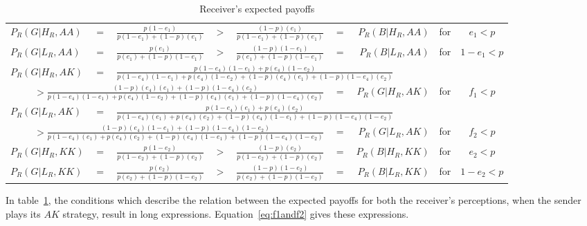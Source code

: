 \documentclass[a4paper,12pt]{article}
\numberwithin{equation}{section}
\begin{document}
\begin{table}[h]
\begin{center}
\setlength{\tabcolsep}{.22em}
\begin{tabular}{lcccccrcc}
$P_{R}(G|H_{R},AA)$ & $=$ & $\frac{p(1-e_{1})}{p(1-e_{1})+(1-p)(e_{1})}$ & $>$ & $\frac{(1-p)(e_{1})}{p(1-e_{1})+(1-p)(e_{1})}$ & $=$ & $P_{R}(B|H_{R},AA)$ & for & $e_{1}<p$\\
$P_{R}(G|L_{R},AA)$ & $=$ & $\frac{p(e_{1})}{p(e_{1})+(1-p)(1-e_{1})}$ & $>$ & $\frac{(1-p)(1-e_{1})}{p(e_{1})+(1-p)(1-e_{1})}$ & $=$ & $P_{R}(B|L_{R},AA)$ & for & $1-e_{1}<p$
\vspace{1mm}\\
$P_{R}(G|H_{R},AK)$ & $=$ & \multicolumn{7}{l}{$\frac{p(1-e_{4})(1-e_{1})+p(e_{4})(1-e_{2})}{p(1-e_{4})(1-e_{1})+p(e_{4})(1-e_{2})+(1-p)(e_{4})(e_{1})+(1-p)(1-e_{4})(e_{2})}$}
\vspace{1mm}\\
\multicolumn{5}{r}{$> \frac{(1-p)(e_{4})(e_{1})+(1-p)(1-e_{4})(e_{2})}{p(1-e_{4})(1-e_{1})+p(e_{4})(1-e_{2})+(1-p)(e_{4})(e_{1})+(1-p)(1-e_{4})(e_{2})}$} & $=$ & $P_{R}(G|H_{R},AK)$ & for & $f_{1}<p$
\vspace{2mm}\\
$P_{R}(G|L_{R},AK)$ & $=$ & \multicolumn{7}{l}{$\frac{p(1-e_{4})(e_{1})+p(e_{4})(e_{2})}{p(1-e_{4})(e_{1})+p(e_{4})(e_{2})+(1-p)(e_{4})(1-e_{1})+(1-p)(1-e_{4})(1-e_{2})}$}
\vspace{1mm}\\
\multicolumn{5}{r}{$> \frac{(1-p)(e_{4})(1-e_{1})+(1-p)(1-e_{4})(1-e_{2})}{p(1-e_{4})(e_{1})+p(e_{4})(e_{2})+(1-p)(e_{4})(1-e_{1})+(1-p)(1-e_{4})(1-e_{2})}$} & $=$ & $P_{R}(G|L_{R},AK)$ & for & $f_{2}<p$
\vspace{2mm}\\
$P_{R}(G|H_{R},KK)$ & $=$ & $\frac{p(1-e_{2})}{p(1-e_{2})+(1-p)(e_{2})}$ & $>$ & $\frac{(1-p)(e_{2})}{p(1-e_{2})+(1-p)(e_{2})}$ & $=$ & $P_{R}(B|H_{R},KK)$ & for & $e_{2}<p$\\
$P_{R}(G|L_{R},KK)$ & $=$ & $\frac{p(e_{2})}{p(e_{2})+(1-p)(1-e_{2})}$ & $>$ & $\frac{(1-p)(1-e_{2})}{p(e_{2})+(1-p)(1-e_{2})}$ & $=$ & $P_{R}(B|L_{R},KK)$ & for & $1-e_{2}<p$
\end{tabular}
\end{center}
\caption{Receiver's expected payoffs}
\label{tab:CueGamewithConditionalAmplification/ConditionalPayoffsR}
\end{table}

In table~\ref{tab:CueGamewithConditionalAmplification/ConditionalPayoffsR}, the conditions which describe the relation between the expected payoffs for both the receiver's perceptions, when the sender plays its $AK$ strategy, result in long expressions. Equation~\ref{eq:f1andf2} gives these expressions.
\end{document}
